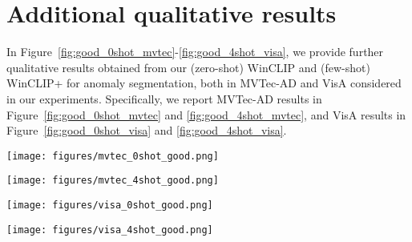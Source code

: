 \section{Additional qualitative results}

In Figure~\ref{fig:good_0shot_mvtec}-\ref{fig:good_4shot_visa}, we provide further qualitative results obtained from our (zero-shot) WinCLIP and (few-shot) WinCLIP+ for anomaly segmentation, both in MVTec-AD and VisA considered in our experiments. Specifically, we report MVTec-AD results in Figure~\ref{fig:good_0shot_mvtec} and \ref{fig:good_4shot_mvtec}, and VisA results in Figure~\ref{fig:good_0shot_visa} and \ref{fig:good_4shot_visa}.

\begin{figure*}[ht]
  \texttt{[image: figures/mvtec\_0shot\_good.png]}
  \caption{Additional qualitative results from WinCLIP (0-shot), tested on MVTec-AD.}
  \label{fig:good_0shot_mvtec}
\end{figure*}

\begin{figure*}[ht]
  \texttt{[image: figures/mvtec\_4shot\_good.png]}
  \caption{Additional qualitative results from few-shot WinCLIP+ (4-shot), tested on MVTec-AD.}
  \label{fig:good_4shot_mvtec}
\end{figure*}

\begin{figure*}[ht]
  \texttt{[image: figures/visa\_0shot\_good.png]}
  \caption{Additional qualitative results from WinCLIP (0-shot), tested on VisA.}
  \label{fig:good_0shot_visa}
  \vspace{0.1in}
  \texttt{[image: figures/visa\_4shot\_good.png]}
  \caption{Additional qualitative results from few-shot WinCLIP+ (4-shot), tested on VisA.}
  \label{fig:good_4shot_visa}
\end{figure*}






